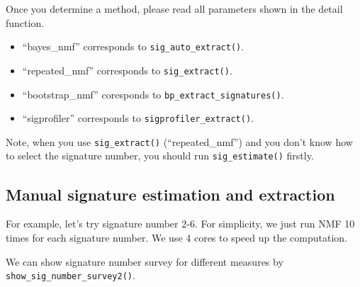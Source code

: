 \documentclass[
  12pt,
  a4paper,
  twoside]{book}
\newenvironment{Shaded}{\begin{snugshade}}{\end{snugshade}}
\newcommand{\AttributeTok}[1]{\textcolor[rgb]{0.77,0.63,0.00}{#1}}
\newcommand{\CommentTok}[1]{\textcolor[rgb]{0.56,0.35,0.01}{\textit{#1}}}
\newcommand{\ConstantTok}[1]{\textcolor[rgb]{0.00,0.00,0.00}{#1}}
\newcommand{\DecValTok}[1]{\textcolor[rgb]{0.00,0.00,0.81}{#1}}
\newcommand{\DocumentationTok}[1]{\textcolor[rgb]{0.56,0.35,0.01}{\textbf{\textit{#1}}}}
\newcommand{\FunctionTok}[1]{\textcolor[rgb]{0.00,0.00,0.00}{#1}}
\newcommand{\NormalTok}[1]{#1}
\newcommand{\OtherTok}[1]{\textcolor[rgb]{0.56,0.35,0.01}{#1}}
\newcommand{\SpecialCharTok}[1]{\textcolor[rgb]{0.00,0.00,0.00}{#1}}
\providecommand{\tightlist}{%
  \setlength{\itemsep}{0pt}\setlength{\parskip}{0pt}}
\begin{document}
Once you determine a method, please read all parameters shown in the detail function.

\begin{itemize}
\tightlist
\item
  ``bayes\_nmf'' corresponds to \texttt{sig\_auto\_extract()}.
\item
  ``repeated\_nmf'' corresponds to \texttt{sig\_extract()}.
\item
  ``bootstrap\_nmf'' coresponds to \texttt{bp\_extract\_signatures()}.
\item
  ``sigprofiler'' corresponds to \texttt{sigprofiler\_extract()}.
\end{itemize}

Note, when you use \texttt{sig\_extract()} (``repeated\_nmf'') and you don't know how
to select the signature number, you should run \texttt{sig\_estimate()} firstly.

\hypertarget{manual-signature-estimation-and-extraction}{%
\subsection{Manual signature estimation and extraction}\label{manual-signature-estimation-and-extraction}}

For example, let's try signature number 2-6. For simplicity, we just run NMF 10 times for each signature number. We use 4 cores to speed up the computation.

\begin{Shaded}
\end{Shaded}

We can show signature number survey for different measures by \texttt{show\_sig\_number\_survey2()}.

\begin{Shaded}
\end{Shaded}
\end{document}

